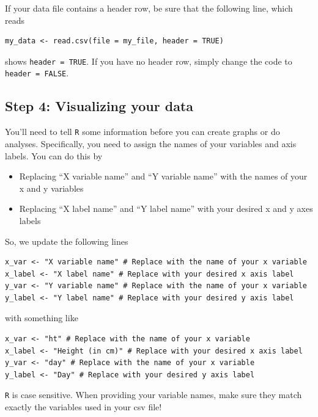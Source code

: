 \documentclass[
]{book}
\providecommand{\tightlist}{%
  \setlength{\itemsep}{0pt}\setlength{\parskip}{0pt}}
\begin{document}
If your data file contains a header row, be sure that the following line, which reads

\begin{verbatim}
my_data <- read.csv(file = my_file, header = TRUE)
\end{verbatim}

shows \texttt{header\ =\ TRUE}. If you have no header row, simply change the code to \texttt{header\ =\ FALSE}.

\hypertarget{step-4-visualizing-your-data}{%
\subsection*{Step 4: Visualizing your data}\label{step-4-visualizing-your-data}}

You'll need to tell \texttt{R} some information before you can create graphs or do analyses. Specifically, you need to assign the names of your variables and axis labels. You can do this by

\begin{itemize}
\tightlist
\item
  Replacing ``X variable name'' and ``Y variable name'' with the names of your x and y variables
\item
  Replacing ``X label name'' and ``Y label name'' with your desired x and y axes labels
\end{itemize}

So, we update the following lines

\begin{verbatim}
x_var <- "X variable name" # Replace with the name of your x variable
x_label <- "X label name" # Replace with your desired x axis label
y_var <- "Y variable name" # Replace with the name of your x variable
y_label <- "Y label name" # Replace with your desired y axis label
\end{verbatim}

with something like

\begin{verbatim}
x_var <- "ht" # Replace with the name of your x variable
x_label <- "Height (in cm)" # Replace with your desired x axis label
y_var <- "day" # Replace with the name of your x variable
y_label <- "Day" # Replace with your desired y axis label
\end{verbatim}

\texttt{R} is case sensitive. When providing your variable names, make sure they match exactly the variables used in your csv file!
\end{document}
